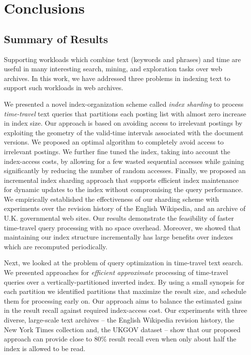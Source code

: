 \chapter{Conclusions}
\label{chap:conclusions}

\section{Summary of Results}
 Supporting workloads which combine text (keywords and phrases) and time are useful in many interesting search, mining, and exploration tasks over web archives. In this work, we have addressed three problems in indexing text to support such workloads in web archives. 

 We presented a novel index-organization scheme called \emph{index sharding} to process \emph{time-travel} text queries that partitions each posting list with almost zero increase in index size. Our approach is based on avoiding access to irrelevant postings by exploiting the geometry of the valid-time intervals associated with the document versions. We proposed an optimal algorithm to completely avoid access to irrelevant postings. We further fine tuned the index, taking into account the index-access costs, by allowing for a few wasted sequential accesses while gaining significantly by reducing the number of random accesses. Finally, we proposed an incremental index sharding approach that supports efficient index maintenance for dynamic updates to the index without compromising the query performance. We empirically established the effectiveness of our sharding scheme with experiments over the revision history of the English Wikipedia, and an archive of U.K. governmental web sites. Our results demonstrate the feasibility of faster time-travel query processing with no space overhead. Moreover, we showed that maintaining our index structure incrementally has large benefits over indexes which are recomputed periodically.

Next, we looked at the problem of query optimization in time-travel text search. We presented approaches for \emph{efficient approximate} processing of time-travel queries over a vertically-partitioned inverted index. By using a small synopsis for each partition we identified partitions that maximize the result size, and schedule them for processing early on. Our approach aims to balance the estimated gains in the result recall against required index-access cost. Our experiments with three diverse, large-scale text archives -- the English Wikipedia revision history, the New York Times collection and, the UKGOV dataset -- show that our proposed approach can provide close to 80\% result recall even when only about half the index is allowed to be read.

